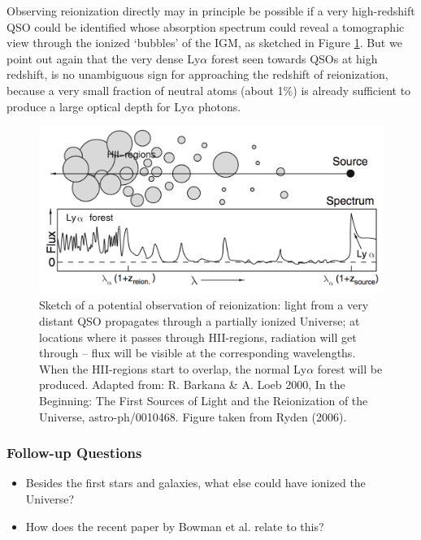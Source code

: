 \documentclass[a4paper,11pt]{article}
\begin{document}
{\noindent}Observing reionization directly may in principle be possible if a very high-redshift QSO could be identified whose absorption spectrum could reveal a tomographic view through the ionized `bubbles' of the IGM, as sketched in Figure \ref{fig:lyaforest}. But we point out again that the very dense Ly$\alpha$ forest seen towards QSOs at high redshift, is no unambiguous sign for approaching the redshift of reionization, because a very small fraction of neutral atoms (about 1\%) is already sufficient to produce a large optical depth for Ly$\alpha$ photons.

\begin{figure}[h!]
    \includegraphics[width=14cm]{figures/LyaForest.png}
    \centering
    \caption{\footnotesize{Sketch of a potential observation of reionization: light from a very distant QSO propagates through a partially ionized Universe; at locations where it passes through HII-regions, radiation will get through -- flux will be visible at the corresponding wavelengths. When the HII-regions start to overlap, the normal Ly$\alpha$ forest will be produced. Adapted from: R. Barkana \& A. Loeb 2000, In the Beginning: The First Sources of Light and the Reionization of the Universe, astro-ph/0010468. Figure taken from Ryden (2006).}}
    \label{fig:lyaforest}
\end{figure}

\subsubsection{Follow-up Questions}

\begin{itemize}
    \item Besides the first stars and galaxies, what else could have ionized the Universe?
    \item How does the recent paper by Bowman et al. relate to this?
\end{itemize}
\end{document}
